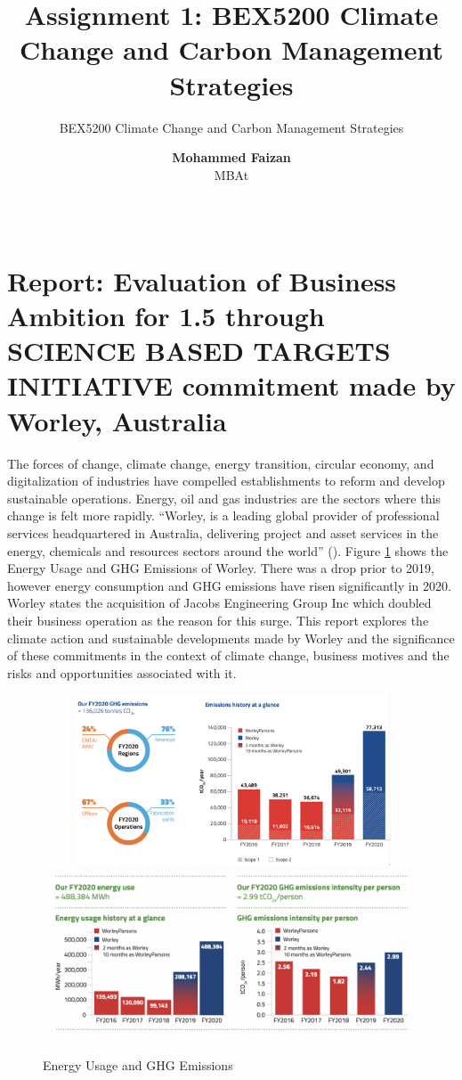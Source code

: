 \documentclass[11pt,a4paper,]{article}
\title{Assignment 1: BEX5200 Climate Change and Carbon Management Strategies}
\subtitle{BEX5200 Climate Change and Carbon Management Strategies}
\author{\sf\Large\textbf{ Mohammed Faizan}\\ {\sf\large MBAt\\[0.5cm]}}
\date{\sf\Date~\Month~\Year}
\makeatletter
\def\titlepage{\front{\expandafter{\@title}}{\@author}{\@organization}}
\makeatother
\begin{document}
\titlepage

{
\setcounter{tocdepth}{2}
\tableofcontents
}
\newpage

\hypertarget{report-evaluation-of-business-ambition-for-1.5-through-science-based-targets-initiative-commitment-made-by-worley-australia}{%
\section{Report: Evaluation of Business Ambition for 1.5 through SCIENCE BASED TARGETS INITIATIVE commitment made by Worley, Australia}\label{report-evaluation-of-business-ambition-for-1.5-through-science-based-targets-initiative-commitment-made-by-worley-australia}}

The forces of change, climate change, energy transition, circular economy, and digitalization of industries have compelled establishments to reform and develop sustainable operations. Energy, oil and gas industries are the sectors where this change is felt more rapidly. ``Worley, is a leading global provider of professional services headquartered in Australia, delivering project and asset services in the energy, chemicals and resources sectors around the world'' (\textcite{sustainabilityreport2020}). Figure \ref{fig:totalcarbonemissions} shows the Energy Usage and GHG Emissions of Worley. There was a drop prior to 2019, however energy consumption and GHG emissions have risen significantly in 2020. Worley states the acquisition of Jacobs Engineering Group Inc which doubled their business operation as the reason for this surge. This report explores the climate action and sustainable developments made by Worley and the significance of these commitments in the context of climate change, business motives and the risks and opportunities associated with it.

\begin{figure}[H]
\includegraphics[width=7in, height = 2in]{Figures/emissionhistory}
\includegraphics[width=7in, height = 2in]{Figures/energyusageandemissions.png}
\caption{Energy Usage and GHG Emissions}
\label{fig:totalcarbonemissions}
\end{figure}
\end{document}
